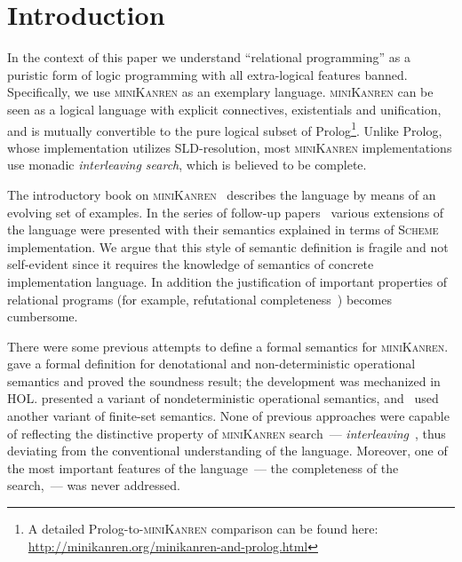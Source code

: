 \section{Introduction}

In the context of this paper we understand ``relational programming'' as a puristic form of logic programming with all extra-logical
features banned. Specifically, we use \textsc{miniKanren} as an exemplary language. \textsc{miniKanren} can be seen as
a logical language with explicit connectives, existentials and unification, and is mutually convertible to the pure logical subset of
Prolog\footnote{A detailed Prolog-to-\textsc{miniKanren} comparison can be found here: \url{http://minikanren.org/minikanren-and-prolog.html}}.
Unlike Prolog, whose implementation utilizes SLD-resolution, most \textsc{miniKanren} implementations use monadic \emph{interleaving
search}, which is believed to be complete.

The introductory book on \textsc{miniKanren}~\cite{TRS} describes the language by means of an evolving set of examples. In the
series of follow-up papers~\cite{MicroKanren,CKanren,CKanren1,AlphaKanren,2016,Guided} various extensions of the language were presented with
their semantics explained in terms of \textsc{Scheme} implementation. We argue that this style of semantic definition is
fragile and not self-evident since it requires the knowledge of semantics of concrete implementation language. In addition the justification of
important properties of relational programs (for example, refutational completeness~\cite{WillThesis}) becomes cumbersome.

There were some previous attempts to define a formal semantics for \textsc{miniKanren}. \citet{MechanisingMiniKanren} gave a formal definition
for denotational and non-deterministic operational semantics and proved the soundness result; the development was mechanized in HOL. 
\citet{RelConversion} presented a variant of nondeterministic operational semantics, and~\citet{DivTest} used another variant of finite-set semantics.
None of previous approaches were capable of reflecting the distinctive property of \textsc{miniKanren} search~--- \emph{interleaving}~\cite{Search},
thus deviating from the conventional understanding of the language. Moreover, one of the most important features of the
language~--- the completeness of the search,~--- was never addressed.


